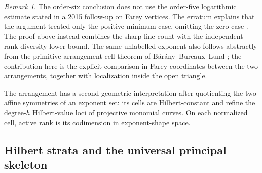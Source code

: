 \documentclass[11pt,reqno]{amsart}
\theoremstyle{definition}
\theoremstyle{remark}
\newtheorem{remark}[theorem]{Remark}
\begin{document}
\begin{remark}\label{rem:farey-erratum}
The order-six conclusion does not use the order-five logarithmic estimate
stated in a 2015 follow-up on Farey vertices.  The erratum explains that
the argument treated only the positive-minimum case, omitting the zero case
\cite{KhoshnoudiradFareyVertices2015,KhoshnoudiradErratum2016}.  The proof
above instead combines the sharp line count with the independent
rank-diversity lower bound.  The same unlabelled exponent also follows
abstractly from the primitive-arrangement cell theorem of
B\'ar\'any--Bureaux--Lund \cite[Theorem~5.6]{BaranyBureauxLund2018}; the
contribution here is the explicit comparison in Farey coordinates between
the two arrangements, together with localization inside the open triangle.
\end{remark}

The arrangement has a second geometric interpretation after quotienting
the two affine symmetries of an exponent set: its cells are Hilbert-constant
and refine the degree-$h$ Hilbert-value loci of projective monomial curves.
On each normalized cell, active rank is its codimension in exponent-shape
space.

\subsection{Hilbert strata and the universal principal skeleton}
\end{document}
